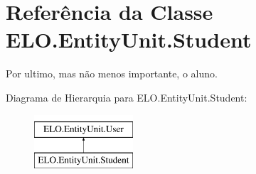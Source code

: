 \hypertarget{classELO_1_1EntityUnit_1_1Student}{\section{Referência da Classe E\-L\-O.\-Entity\-Unit.\-Student}
\label{dd/d1d/classELO_1_1EntityUnit_1_1Student}
}


Por ultimo, mas não menos importante, o aluno.  


Diagrama de Hierarquia para E\-L\-O.\-Entity\-Unit.\-Student\-:\begin{figure}[H]
\begin{center}
\leavevmode
\includegraphics[height=2.000000cm]{dd/d1d/classELO_1_1EntityUnit_1_1Student}
\end{center}
\end{figure}
